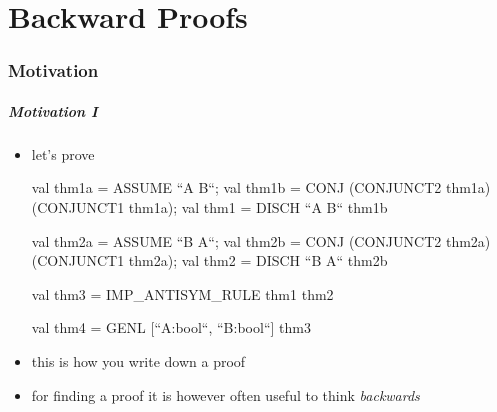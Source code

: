 \part{Backward Proofs}

\section{Motivation}
\frame[plain]{\partpage}

\begin{frame}[fragile]
\frametitle{Motivation I}
\begin{itemize}
\item let's prove 
\begin{semiverbatim}
\scriptsize
{}
val thm1a = ASSUME ``A \holAnd{} B``;
val thm1b = CONJ (CONJUNCT2 thm1a) (CONJUNCT1 thm1a);
val thm1  = DISCH ``A \holAnd{} B`` thm1b

val thm2a = ASSUME ``B \holAnd{} A``;
val thm2b = CONJ (CONJUNCT2 thm2a) (CONJUNCT1 thm2a);
val thm2  = DISCH ``B \holAnd{} A`` thm2b

val thm3  = IMP_ANTISYM_RULE thm1 thm2

val thm4  = GENL [``A:bool``, ``B:bool``] thm3
\end{semiverbatim}
\bigskip
\item this is how you write down a proof
\item for finding a proof it is however often useful to think \emph{backwards}
\end{itemize}
\end{frame}


